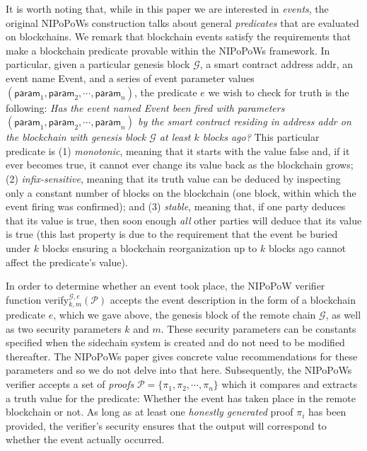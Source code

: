 It is worth noting that, while in this paper we are interested in \emph{events},
the original NIPoPoWs construction talks about general \emph{predicates} that
are evaluated on blockchains. We remark that blockchain events satisfy the
requirements that make a blockchain predicate provable within the NIPoPoWs
framework. In particular, given a particular genesis block $\mathcal{G}$, a
smart contract address \textsf{addr}, an event name \textsf{Event}, and
a series of event parameter values
$(\textsf{param}_1, \textsf{param}_2, \cdots, \textsf{param}_n)$, the predicate
$e$ we wish to check for truth is the following: \emph{Has the event named
\textsf{Event} been fired with parameters $(\textsf{param}_1, \textsf{param}_2,
\cdots, \textsf{param}_n)$ by the smart contract residing in address
\textsf{addr} on the blockchain with genesis block $\mathcal{G}$ at least $k$
blocks ago?} This particular predicate is (1) \emph{monotonic}, meaning that it
starts with the value \textsf{false} and, if it ever becomes \textsf{true}, it
cannot ever change its value back as the blockchain grows; (2)
\emph{infix-sensitive}, meaning that its truth value can be deduced by
inspecting only a constant number of blocks on the blockchain (one block, within
which the event firing was confirmed); and (3) \emph{stable}, meaning that, if
one party deduces that its value is \textsf{true}, then soon enough \emph{all}
other parties will deduce that its value is \textsf{true} (this last property is
due to the requirement that the event be buried under $k$ blocks ensuring a
blockchain reorganization up to $k$ blocks ago cannot affect the predicate's
value).

In order to determine whether an event took place, the NIPoPoW verifier function
\textsf{verify}$^{\mathcal{G},e}_{k,m}(\mathcal{P})$ accepts the event
description in the form of a blockchain predicate $e$, which we gave above, the
genesis block of the remote chain $\mathcal{G}$, as well as two security
parameters $k$ and $m$. These security parameters can be constants specified
when the sidechain system is created and do not need to be modified thereafter.
The NIPoPoWs paper gives concrete value recommendations for these parameters and
so we do not delve into that here. Subsequently, the NIPoPoWs verifier accepts a
set of \emph{proofs} $\mathcal{P} = \{\pi_1, \pi_2, \cdots, \pi_n\}$ which it
compares and extracts a truth value for the predicate: Whether the event has
taken place in the remote blockchain or not. As long as at least one
\emph{honestly generated} proof $\pi_i$ has been provided, the verifier's
security ensures that the output will correspond to whether the event actually
occurred.


